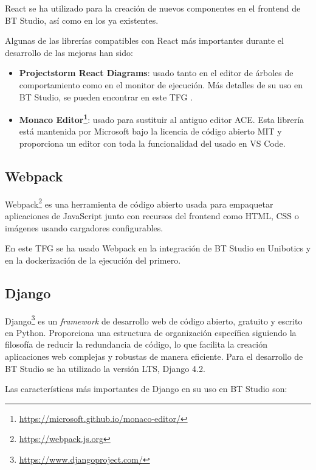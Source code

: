 React se ha utilizado para la creación de nuevos componentes en el frontend de BT Studio, así como en los ya existentes.

Algunas de las librerías compatibles con React más importantes durante el desarrollo de las mejoras han sido:

\begin{itemize}
    \item \textbf{Projectstorm React Diagrams}: usado tanto en el editor de árboles de comportamiento como en el monitor de ejecución. Más detalles de su uso en BT Studio, se pueden encontrar en este TFG \cite{TFG_BT_Studio}.
    \item \textbf{Monaco Editor\footnote{\url{https://microsoft.github.io/monaco-editor/}}}: usado para sustituir al antiguo editor ACE. Esta librería está mantenida por Microsoft bajo la licencia de código abierto MIT y proporciona un editor con toda la funcionalidad del usado en VS Code.
\end{itemize}

\subsection{Webpack}

Webpack\footnote{\url{https://webpack.js.org}} es una herramienta de código abierto usada para empaquetar aplicaciones de JavaScript junto con recursos del frontend como HTML, CSS o imágenes usando cargadores configurables.

En este TFG se ha usado Webpack en la integración de BT Studio en Unibotics y en la dockerización de la ejecución del primero.   

\subsection{Django}

Django\footnote{\url{https://www.djangoproject.com/}} es un \textit{framework} de desarrollo web de código abierto, gratuito y escrito en Python. Proporciona una estructura de organización específica siguiendo la filosofía de reducir la redundancia de código, lo que facilita la creación aplicaciones web complejas y robustas de manera eficiente. Para el desarrollo de BT Studio se ha utilizado la versión LTS, Django 4.2. 

\noindent Las características más importantes de Django en su uso en BT Studio son:

